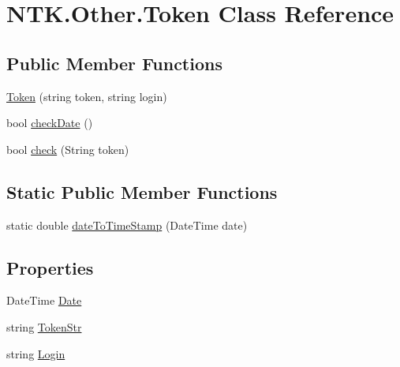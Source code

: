 \hypertarget{class_n_t_k_1_1_other_1_1_token}{}\section{N\+T\+K.\+Other.\+Token Class Reference}
\label{class_n_t_k_1_1_other_1_1_token}


 


\subsection*{Public Member Functions}
\begin{DoxyCompactItemize}
\item 
\mbox{\hyperlink{class_n_t_k_1_1_other_1_1_token_af301273341f9c562de715cb577dd94cb}{Token}} (string token, string login)
\item 
bool \mbox{\hyperlink{class_n_t_k_1_1_other_1_1_token_a209735bea798d60032147504b0361e8f}{check\+Date}} ()
\item 
bool \mbox{\hyperlink{class_n_t_k_1_1_other_1_1_token_aec2b62dbf00f5d33859c29db2e5ee054}{check}} (String token)
\end{DoxyCompactItemize}
\subsection*{Static Public Member Functions}
\begin{DoxyCompactItemize}
\item 
static double \mbox{\hyperlink{class_n_t_k_1_1_other_1_1_token_aa16a2c81ecf086b9894f877eb670cd11}{date\+To\+Time\+Stamp}} (Date\+Time date)
\end{DoxyCompactItemize}
\subsection*{Properties}
\begin{DoxyCompactItemize}
\item 
Date\+Time \mbox{\hyperlink{class_n_t_k_1_1_other_1_1_token_a817bb53bf41d954b5d6a289caa304816}{Date}}
\item 
string \mbox{\hyperlink{class_n_t_k_1_1_other_1_1_token_a8d218f446c6f8198dbe07bdf897cd6bf}{Token\+Str}}
\item 
string \mbox{\hyperlink{class_n_t_k_1_1_other_1_1_token_a29d851ed4017a3ecabf70febe3eda6c7}{Login}}
\end{DoxyCompactItemize}


